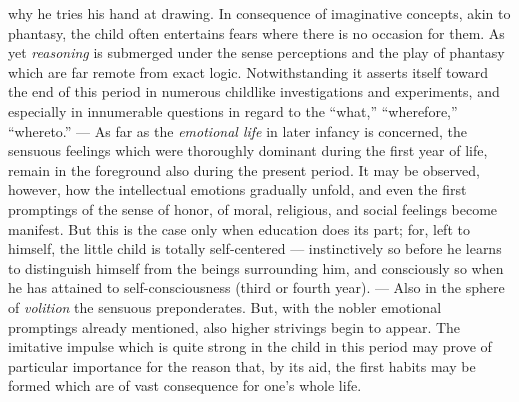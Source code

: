 why he tries his hand at drawing. In consequence of imaginative concepts, akin to phantasy, the child often entertains fears where there is no occasion for them. As yet \emph{reasoning} is submerged under the sense perceptions and the play of phantasy which are far remote from exact logic. Notwithstanding it asserts itself toward the end of this period in numerous childlike investigations and experiments, and especially in innumerable questions in regard to the “what,” “wherefore,” “whereto.” — As far as the \emph{emotional life} in later infancy is concerned, the sensuous feelings which were thoroughly dominant during the first year of life, remain in the foreground also during the present period. It may be observed, however, how the intellectual emotions gradually unfold, and even the first promptings of the sense of honor, of moral, religious, and social feelings become manifest. But this is the case only when education does its part; for, left to himself, the little child is totally self-centered — instinctively so before he learns to distinguish himself from the beings surrounding him, and consciously so when he has attained to self-consciousness (third or fourth year). — Also in the sphere of \emph{volition} the sensuous preponderates. But, with the nobler emotional promptings already mentioned, also higher strivings begin to appear. The imitative impulse which is quite strong in the child in this period may prove of particular importance for the reason that, by its aid, the first habits may be formed which are of vast consequence for one’s whole life.

